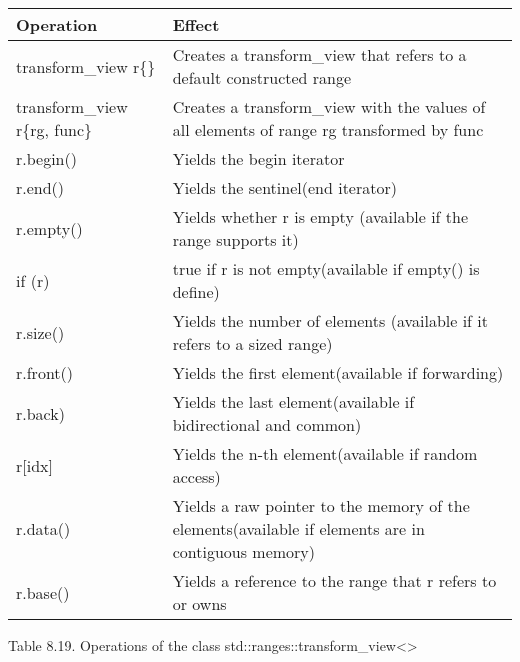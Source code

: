 \begin{longtable}[c]{|l|l|}
\hline
\textbf{Operation} & \textbf{Effect}                                                \\ \hline
\endfirsthead
%
\endhead
%
transform\_view r\{\}         & Creates a transform\_view that refers to a default constructed range                               \\ \hline
transform\_view r\{rg, func\} & Creates a transform\_view with the values of all elements of range rg transformed by func          \\ \hline
r.begin()          & Yields the begin iterator                                      \\ \hline
r.end()            & Yields the sentinel(end iterator)                              \\ \hline
r.empty()          & Yields whether r is empty (available if the range supports it) \\ \hline
if (r)             & true if r is not empty(available if empty() is define)         \\ \hline
r.size()                      & Yields the number of elements (available if it refers to a sized range)                            \\ \hline
r.front()          & Yields the first element(available if forwarding)              \\ \hline
r.back)            & Yields the last element(available if bidirectional and common) \\ \hline
r{[}idx{]}         & Yields the n-th element(available if random access)            \\ \hline
r.data()                      & Yields a raw pointer to the memory of the elements(available if elements are in contiguous memory) \\ \hline
r.base()           & Yields a reference to the range that r refers to or owns       \\ \hline
\end{longtable}

\begin{center}
Table 8.19. Operations of the class std::ranges::transform\_view<>
\end{center}


